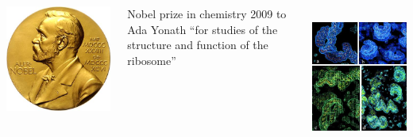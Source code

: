 \documentclass[10pt,t]{beamer}
\begin{document}
\begin{frame}
\begin{columns}
    \begin{minipage}[c]{0.2\textwidth}
        \includegraphics[width=\textwidth]{nobelpreis}
    \end{minipage}
    \hfill
    \begin{minipage}[c]{0.75\textwidth}\raggedright\footnotesize
        Nobel prize in chemistry 2009 to Ada Yonath ``for studies of the structure and function of the ribosome''
    \end{minipage}
~\\[-\baselineskip]
    \includegraphics[width=\textwidth]{ribosomen-messung}

\end{columns}
\end{frame}
\end{document}
